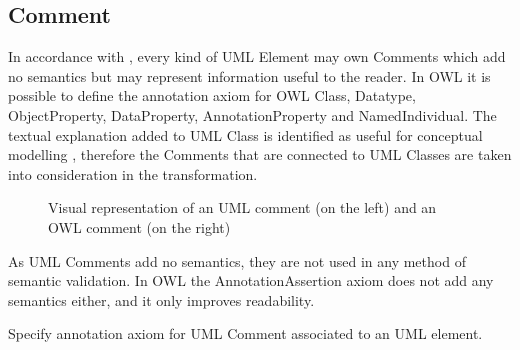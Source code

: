 \subsection{Comment}

In accordance with \citep{uml2.5}, every kind of UML Element may own Comments which
add no semantics but may represent information useful to the reader. In OWL it
is possible to define the annotation axiom for OWL Class, Datatype,
ObjectProperty, DataProperty, AnnotationProperty and
NamedIndividual. The textual explanation added to UML Class is identified
as useful for conceptual modelling \cite{uml-userguide}, therefore the Comments that are
connected to UML Classes are taken into consideration in the transformation.

\begin{figure}[]
	\centering
	\begin{subfigure}{.4\textwidth}
		\centering
	\end{subfigure}%
	\begin{subfigure}{.6\textwidth}
		\centering
	\end{subfigure}
	\caption{Visual representation of an UML comment (on the left) and an OWL comment (on the right)}
	\label{fig:comment-visual}
\end{figure}

As UML Comments add no semantics, they are not used in any method of
semantic validation. In OWL the AnnotationAssertion \citep{owl2} axiom does
not add any semantics either, and it only improves readability.

\begin{trule}[Comment]
	\label{rule:elemen-external-comment}	
	Specify annotation axiom for UML Comment associated to an UML element. 
\end{trule}

